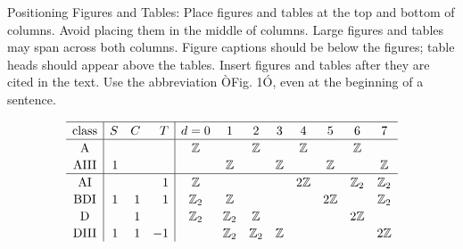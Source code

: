 \documentclass[letterpaper, 10 pt, conference]{ieeeconf}  %
\begin{document}
Positioning Figures and Tables: Place figures and tables at the top and bottom of columns. Avoid placing them in the middle of columns. Large figures and tables may span across both columns. Figure captions should be below the figures; table heads should appear above the tables. Insert figures and tables after they are cited in the text. Use the abbreviation ÒFig. 1Ó, even at the beginning of a sentence.

\newcommand\T{\rule{0pt}{1em}}

$$
\begin{array}{c|rrr|cccccccc}
\hline
\color{black}{\textrm{class}} & \color{black}{S} & \color{black}{C} & \color{black}{T} & \color{black}{d=0} & \color{black}{1} & \color{black}{2} & \color{black}{3} & \color{black}{4} & \color{black}{5} & \color{black}{6} & \color{black}{7}\T\\
\hline \color{black}{\textrm{A}} & \color{black}{} & \color{black}{} & \color{black}{} & \color{black}{\mathbb{Z}} & \color{black}{} & \color{black}{\mathbb{Z}} & \color{black}{} & \color{black}{\mathbb{Z}} & \color{black}{} & \color{black}{\mathbb{Z}} & \color{black}{}\T\\
\color{black}{\textrm{AIII}} & \color{black}{1} & \color{black}{} & \color{black}{} & \color{black}{} & \color{black}{\mathbb{Z}} & \color{black}{} & \color{black}{\mathbb{Z}} & \color{black}{} & \color{black}{\mathbb{Z}} & \color{black}{} & \color{black}{\mathbb{Z}}\T\\
\hline \color{black}{\textrm{AI}} & \color{black}{} & \color{black}{} & \color{black}{1} & \color{black}{\mathbb{Z}} & \color{black}{} & \color{black}{} & \color{black}{} & \color{black}{2\mathbb{Z}} & \color{black}{} & \color{black}{\mathbb{Z}_2} & \color{black}{\mathbb{Z}_2}\T\\
\color{black}{\textrm{BDI}} & \color{black}{1} & \color{black}{1} & \color{black}{1} & \color{black}{\mathbb{Z}_2} & \color{black}{\mathbb{Z}} & \color{black}{} & \color{black}{} & \color{black}{} & \color{black}{2\mathbb{Z}} & \color{black}{} & \color{black}{\mathbb{Z}_2}\T\\
\color{black}{\textrm{D}} & \color{black}{} & \color{black}{1} & \color{black}{} & \color{black}{\mathbb{Z}_2} & \color{black}{\mathbb{Z}_2} & \color{black}{\mathbb{Z}} & \color{black}{} & \color{black}{} & \color{black}{} & \color{black}{2\mathbb{Z}} & \color{black}{}\T\\
\color{black}{\textrm{DIII}} & \color{black}{1} & \color{black}{1} & \color{black}{-1} & \color{black}{} & \color{black}{\mathbb{Z}_2} & \color{black}{\mathbb{Z}_2} & \color{black}{\mathbb{Z}} & \color{black}{} & \color{black}{} & \color{black}{} & \color{black}{2\mathbb{Z}}\T\\

\end{array}$$
\end{document}

